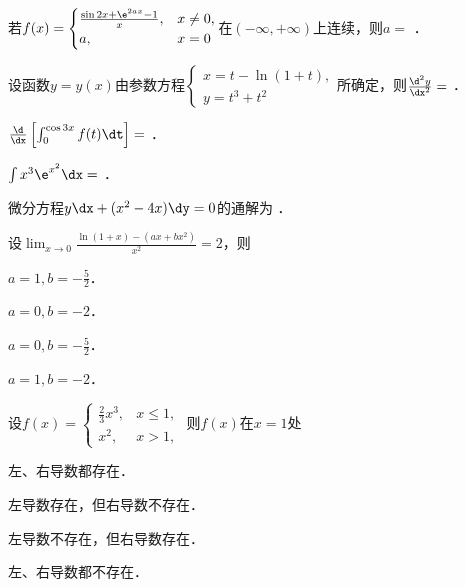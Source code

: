 \documentclass[plain,noanswer,medmath]{../../template/jnuexam}
\begin{document}






\begin{problem}
若$f(x) = \begin{cases}
  \frac{\sin 2x + \e^{2ax} - 1}{x}, & x \ne 0, \\
                                 a, & x = 0
\end{cases}$在$(-\infty , +\infty)$上连续，则$a =$ \fillin{}．
\end{problem}


\begin{problem}
设函数$y = y(x)$由参数方程$\begin{cases}
  x = t - \ln(1 + t), \\
  y = t^3 + t^2
\end{cases}$所确定，则$\frac{\d^2 y}{\dx^2} =$ \fillin{}．
\end{problem}


\begin{problem}
$\frac{\d}{\dx}\left[\int_0^{\cos 3x} f(t)\dt \right] =$ \fillin{}．
\end{problem}


\begin{problem}
$\int x^3\e^{x^2} \dx =$ \fillin{}．
\end{problem}


\begin{problem}
微分方程$y\dx + (x^2 - 4x)\dy = 0$的通解为 \fillin{}．
\end{problem}




\begin{problem}
设$\lim_{x \to 0} \frac{\ln(1 + x) - (ax + bx^2)}{x^2} = 2$，则\pickout{}
\begin{abcd}
\item $a = 1,b = - \frac{5}{2}$．		
\item $a = 0,b = - 2$．
\item $a = 0,b = - \frac{5}{2}$．		
\item $a = 1,b = - 2$．
\end{abcd}
\end{problem}


\begin{problem}
设$f(x) = \begin{cases}
  \frac{2}{3}x^3, & x \le 1, \\
             x^2, & x > 1,
\end{cases}$ 则$f(x)$在$x = 1$处\pickout{}
\begin{abcd}
\item 左、右导数都存在．				
\item 左导数存在，但右导数不存在．
\item 左导数不存在，但右导数存在．	
\item 左、右导数都不存在．
\end{abcd}
\end{problem}
\end{document}
